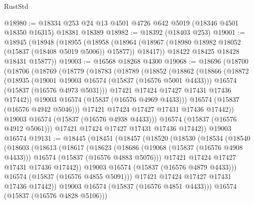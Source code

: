 \begin{lexlean}{RustStd}
\begin{coremodule}
{\begin{coremodule}
{{{{{{{{{{{{{{{{{{{{{{{{{{{{{{{{{{{{{{{{{{{{{{{{{{{{{{{{{{{{@18980 := @18334 @253 @24 @13 @4501 @4726 @642 @5019 (@18346 @4501 @18350 @16315) @18381 @18389
@18982 := @18392 (@18403 @253)
@19001 := @18945
    (@18948
      (@18955
        (@18958
          (@18964 (@18967 (@18980 @18982 @18052 (@15837 (@18408 @5019 @5006)) @15877)) @18417))
        @18422
        @18425
        @18428
        @18431
        @15877))
@19003 := @16568 @18268 @4300
@19068 := @18696
    (@18700
      (@18706
        (@18769
          (@18779
            (@18783
              (@18789
                (@18852
                  (@18862
                    (@18866
                      (@18872
                        (@18935
                          (@19001 @19003 @16574 (@15837 (@16576 @5001 @4433)))
                          @16574
                          (@15837 (@16576 @4973 @5031)))
                        @17421
                        @17424
                        @17427
                        @17431
                        @17436
                        @17442))
                    @19003
                    @16574
                    (@15837 (@16576 @4969 @4433)))
                  @16574
                  (@15837 (@16576 @4942 @5046)))
                @17421
                @17424
                @17427
                @17431
                @17436
                @17442))
            @19003
            @16574
            (@15837 (@16576 @4938 @4433)))
          @16574
          (@15837 (@16576 @4912 @5061)))
        @17421
        @17424
        @17427
        @17431
        @17436
        @17442))
    @19003
    @16574
@19131 := @18445
    (@18451
      (@18457
        (@18520
          (@18530
            (@18534
              (@18540
                (@18603
                  (@18613
                    (@18617
                      (@18623
                        (@18686
                          (@19068 (@15837 (@16576 @4908 @4433)))
                          @16574
                          (@15837 (@16576 @4883 @5076)))
                        @17421
                        @17424
                        @17427
                        @17431
                        @17436
                        @17442))
                    @19003
                    @16574
                    (@15837 (@16576 @4879 @4433)))
                  @16574
                  (@15837 (@16576 @4855 @5091)))
                @17421
                @17424
                @17427
                @17431
                @17436
                @17442))
            @19003
            @16574
            (@15837 (@16576 @4851 @4433)))
          @16574
          (@15837 (@16576 @4828 @5106)))
}}}}}}}}}}}}}}}}}}}}}}}}}}}}}}}}}}}}}}}}}}}}}}}}}}}}}}}}}}}}
\end{coremodule}}
\end{coremodule}
\end{lexlean}
